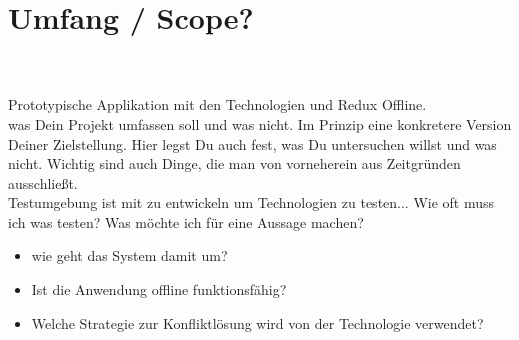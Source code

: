 \section{Umfang / Scope?}
\\\\
Prototypische Applikation mit den Technologien  und Redux Offline. \\
was Dein Projekt umfassen soll und was nicht. Im Prinzip eine konkretere Version Deiner Zielstellung. Hier legst Du auch fest,  was Du untersuchen willst und was nicht. Wichtig sind auch Dinge, die man von vorneherein aus Zeitgründen ausschließt.\\
Testumgebung ist mit zu entwickeln um Technologien zu testen...  Wie oft muss ich was testen? Was möchte ich für eine Aussage machen?
\begin{itemize}
    \item wie geht das System damit um?
  \item Ist die Anwendung offline funktionsfähig?
  \item Welche Strategie zur Konfliktlösung wird von der Technologie verwendet?
\end{itemize}